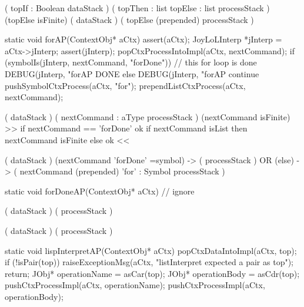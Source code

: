 \preDataStack
  (
    topIf : Boolean
    dataStack
  )
\preProcessStack
  (
    topThen : list
    topElse : list
    processStack
  )
\preConditions
  (topElse isFinite)
\postDataStack
  (
    dataStack
  )
\postProcessStack
  (
    topElse (prepended)
    processStack
  )
\postConditions
\stopRule

\stopJoyLoLWord

\startCCode
static void forAP(ContextObj* aCtx) {
  assert(aCtx);
  JoyLoLInterp *jInterp = aCtx->jInterp;
  assert(jInterp);
  popCtxProcessIntoImpl(aCtx, nextCommand);
  if (symbolIs(jInterp, nextCommand, "forDone")) {
    // this for loop is done
    DEBUG(jInterp, "forAP DONE%
  } else {
    DEBUG(jInterp, "forAP continue%
    pushSymbolCtxProcess(aCtx, "for");
    prependListCtxProcess(aCtx, nextCommand);
  }
}
\stopCCode

\starttyping

\startWord[for]
\preDataStack
  (
    dataStack
  )
\preProcessStack
  (
    nextCommand : aType
    processStack
  )
\preConditions
  (nextCommand isFinite)  >> if nextCommand == 'forDone' ok
                             if nextCommand isList then nextCommand isFinite
                             else ok <<
\stopPreStack

\postDataStack
  (
    dataStack
  )
\postProcessStack
  (nextCommand 'forDone' =symbol) -> (
    processStack
  )
  OR
  (else) -> (
    nextCommand (prepended)
    'for' : Symbol
    processStack
  )
\postConditions
\stopPostStack

\stopWord

\stoptyping

\startCCode
static void forDoneAP(ContextObj* aCtx) {
  // ignore
}
\stopCCode

\starttyping

\startWord[forDone]

\preDataStack
  ( dataStack )
\preProcessStack
  ( processStack )
\preConditions
\stopPreStack

\postDataStack
  ( dataStack )
\postProcessStack
  ( processStack )
\postConditions
\stopPostStack

\stopWord

\stoptyping

\startCCode
static void lispInterpretAP(ContextObj* aCtx) {
  popCtxDataIntoImpl(aCtx, top);
  if (!isPair(top)) {
    raiseExceptionMsg(aCtx,
      "listInterpret expected a pair as top");
    return;
  }
  JObj* operationName = asCar(top);
  JObj* operationBody = asCdr(top);
  pushCtxProcessImpl(aCtx, operationName);
  pushCtxProcessImpl(aCtx, operationBody);
}
\stopCCode

